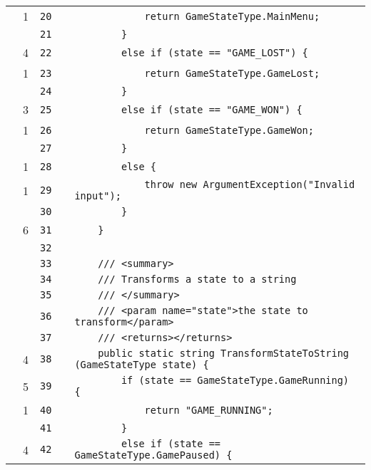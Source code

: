 \documentclass[a4paper,landscape,10pt]{article}
\begin{document}
\begin{longtable}[l]{lrrll}
\cellcolor{green} & 1 & \verb~20~ & & \verb~            return GameStateType.MainMenu;~\\
\cellcolor{gray} &  & \verb~21~ & & \verb~        }~\\
\cellcolor{green} & 4 & \verb~22~ & & \verb~        else if (state == "GAME_LOST") {~\\
\cellcolor{green} & 1 & \verb~23~ & & \verb~            return GameStateType.GameLost;~\\
\cellcolor{gray} &  & \verb~24~ & & \verb~        }~\\
\cellcolor{green} & 3 & \verb~25~ & & \verb~        else if (state == "GAME_WON") {~\\
\cellcolor{green} & 1 & \verb~26~ & & \verb~            return GameStateType.GameWon;~\\
\cellcolor{gray} &  & \verb~27~ & & \verb~        }~\\
\cellcolor{green} & 1 & \verb~28~ & & \verb~        else {~\\
\cellcolor{green} & 1 & \verb~29~ & & \verb~            throw new ArgumentException("Invalid input");~\\
\cellcolor{gray} &  & \verb~30~ & & \verb~        }~\\
\cellcolor{green} & 6 & \verb~31~ & & \verb~    }~\\
\cellcolor{gray} &  & \verb~32~ & & \verb~~\\
\cellcolor{gray} &  & \verb~33~ & & \verb~    /// <summary>~\\
\cellcolor{gray} &  & \verb~34~ & & \verb~    /// Transforms a state to a string~\\
\cellcolor{gray} &  & \verb~35~ & & \verb~    /// </summary>~\\
\cellcolor{gray} &  & \verb~36~ & & \verb~    /// <param name="state">the state to transform</param>~\\
\cellcolor{gray} &  & \verb~37~ & & \verb~    /// <returns></returns>~\\
\cellcolor{green} & 4 & \verb~38~ & & \verb~    public static string TransformStateToString (GameStateType state) {~\\
\cellcolor{green} & 5 & \verb~39~ & & \verb~        if (state == GameStateType.GameRunning) {~\\
\cellcolor{green} & 1 & \verb~40~ & & \verb~            return "GAME_RUNNING";~\\
\cellcolor{gray} &  & \verb~41~ & & \verb~        }~\\
\cellcolor{green} & 4 & \verb~42~ & & \verb~        else if (state == GameStateType.GamePaused) {~\\

\end{longtable}
\end{document}

